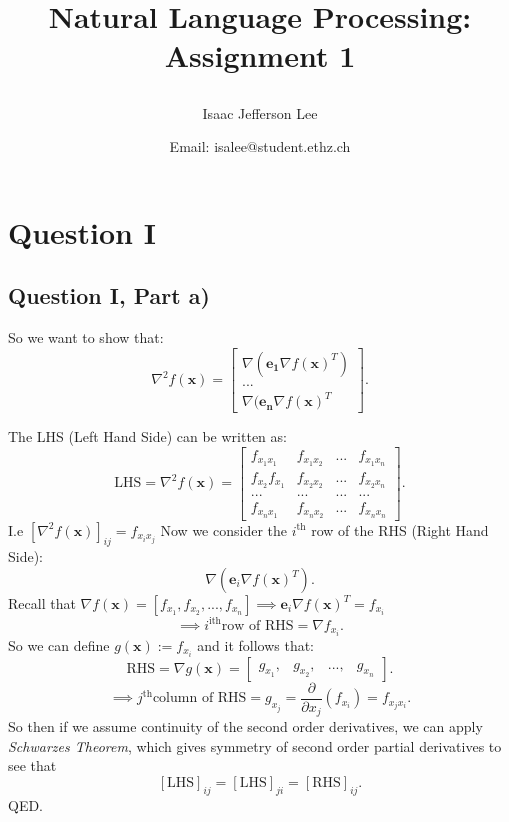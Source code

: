 \documentclass[a4paper]{article}
\title{Natural Language Processing: Assignment 1\author{Isaac Jefferson Lee}\date{Email: isalee@student.ethz.ch}}
\begin{document}
\maketitle
\thispagestyle{fancy} 

\section*{Question I}

\subsection*{Question I, Part a)}

\begin{blackbox}
    So we want to show that:
    \[
    \nabla ^2 f(\bm{x}) = 
    \begin{bmatrix}\nabla(\bm{e_1} \nabla f(\bm{x})^T)\\...\\\nabla(\bm{e_n}\nabla f(\bm{x})^T\end{bmatrix}
    .\]
\end{blackbox}
The LHS (Left Hand Side) can be written as:
\[
\text{LHS} = \nabla ^2 f(\bm{x}) = \begin{bmatrix}f_{x_1x_1} & f_{x_1x_2} & ... & f_{x_1x_n}\\f_{x_2}f_{x_1} & f_{x_2x_2} & ... & f_{x_2x_{n}}\\... & ... & ... & ...\\f_{x_{n}x_1} & f_{x_{n}x_2} & ... & f_{x_{n}x_{n}}\end{bmatrix}
.\]
I.e $[\nabla ^2 f(\bm{x})]_{ij} = f_{x_{i}x_{j}}$
Now we consider the $i^{\text{th}}$ row of the RHS (Right Hand Side):
\[
\nabla (\bm{e}_i \nabla f(\bm{x})^T)
.\]
Recall that $\nabla f(\bm{x}) = [f_{x_1}, f_{x_2}, ..., f_{x_{n}}] \implies \bm{e}_i \nabla f(\bm{x})^T = f_{x_i} $
\[
    \implies i^{\text{ith}} \text{row of RHS} = \nabla f_{x_{i}}
.\]
So we can define $g(\bm{x}) := f_{x_{i}}$ and it follows that:
\[
\text{RHS} = \nabla g(\bm{x}) = \begin{bmatrix}g_{x_1}, & g_{x_2}, & ..., & g_{x_{n}}\end{bmatrix}
.\]
\[
\implies j^{\text{th}} \text{column of RHS} = g_{x_j} = \frac{\partial }{\partial x_j} (f_{x_i}) = f_{x_{j}x_i}
.\]
So then if we assume continuity of the second order derivatives, we can apply
\textit{Schwarzes Theorem}, which gives symmetry of second order partial derivatives
to see that 
\[
    [\text{LHS}]_{ij} = [\text{LHS}]_{ji} = [\text{RHS}]_{ij}
.\]
QED.
\end{document}
